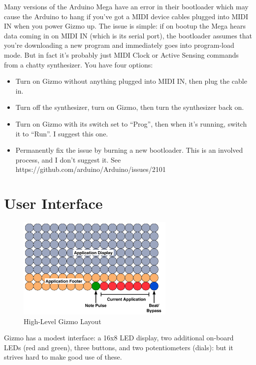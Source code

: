 \documentclass{article}
\begin{document}
Many versions of the Arduino Mega have an error in their bootloader which may cause the Arduino to hang if you've got a MIDI device cables plugged into MIDI IN when you power Gizmo up.  The issue is simple: if on bootup the Mega hears data coming in on MIDI IN (which is its serial port), the bootloader assumes that you're downloading a new program and immediately goes into program-load mode.    But in fact it's probably just MIDI Clock or Active Sensing commands from a chatty synthesizer.  You have four options:

\begin{itemize}
\item Turn on Gizmo without anything plugged into MIDI IN, then plug the cable in.
\item Turn off the synthesizer, turn on Gizmo, then turn the synthesizer back on.
\item Turn on Gizmo with its switch set to ``Prog'', then when it's running, switch it to ``Run''.  I suggest this one.
\item Permanently fix the issue by burning a new bootloader.  This is an involved process, and I don't suggest it.  See https:/\!/github.com/arduino/Arduino/issues/2101
\end{itemize}


\clearpage

\section{User Interface}

\begin{figure}
\vspace{-1.5em}\includegraphics[width=3in]{OverallLayout.pdf}
\vspace{-2em}\caption{\small High-Level Gizmo Layout}
\label{HighLevelGizmoLayout}
\end{figure}

Gizmo has a modest interface: a 16x8 LED display, two additional on-board LEDs (red and green), three buttons, and two potentiometers (dials): but it strives hard to make good use of these.  
\end{document}
